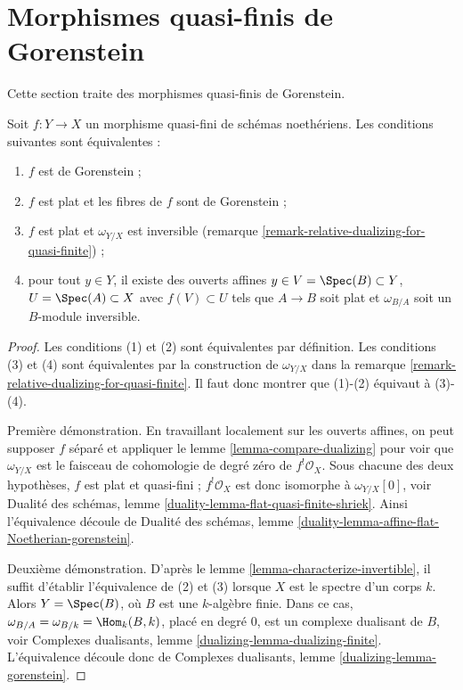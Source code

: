 \section{Morphismes quasi-finis de Gorenstein}
\label{section-gorenstein-lci}

\noindent
Cette section traite des morphismes quasi-finis de Gorenstein.

\begin{lemma}
\label{lemma-gorenstein-quasi-finite}
Soit $f : Y \to X$ un morphisme quasi-fini de schémas noethériens.
Les conditions suivantes sont équivalentes :
\begin{enumerate}
\item $f$ est de Gorenstein ;
\item $f$ est plat et les fibres de $f$ sont de Gorenstein ;
\item $f$ est plat et $\omega_{Y/X}$ est inversible
(remarque \ref{remark-relative-dualizing-for-quasi-finite}) ;
\item pour tout $y \in Y$, il existe des ouverts affines
$y \in V = \Spec(B) \subset Y$, $U = \Spec(A) \subset X$
avec $f(V) \subset U$ tels que $A \to B$ soit plat
et $\omega_{B/A}$ soit un $B$-module inversible.
\end{enumerate}
\end{lemma}

\begin{proof}
Les conditions (1) et (2) sont équivalentes par définition. Les conditions (3) et (4)
sont équivalentes par la construction de $\omega_{Y/X}$ dans la
remarque \ref{remark-relative-dualizing-for-quasi-finite}.
Il faut donc montrer que (1)-(2) équivaut à (3)-(4).

\medskip\noindent
Première démonstration. En travaillant localement sur les ouverts affines, on peut supposer $f$ séparé
et appliquer le lemme \ref{lemma-compare-dualizing} pour voir que
$\omega_{Y/X}$ est le faisceau de cohomologie de degré zéro de $f^!\mathcal{O}_X$.
Sous chacune des deux hypothèses, $f$ est plat et quasi-fini ;
$f^!\mathcal{O}_X$ est donc isomorphe à $\omega_{Y/X}[0]$, voir
Dualité des schémas, lemme \ref{duality-lemma-flat-quasi-finite-shriek}. Ainsi
l'équivalence découle de
Dualité des schémas, lemme
\ref{duality-lemma-affine-flat-Noetherian-gorenstein}.

\medskip\noindent
Deuxième démonstration. D'après le lemme \ref{lemma-characterize-invertible},
il suffit d'établir l'équivalence de
(2) et (3) lorsque $X$ est le spectre d'un corps $k$.
Alors $Y = \Spec(B)$, où $B$ est une $k$-algèbre finie.
Dans ce cas, $\omega_{B/A} = \omega_{B/k} = \Hom_k(B, k)$,
placé en degré $0$, est un complexe dualisant de $B$, voir
Complexes dualisants, lemme \ref{dualizing-lemma-dualizing-finite}.
L'équivalence découle donc de
Complexes dualisants, lemme \ref{dualizing-lemma-gorenstein}.
\end{proof}

